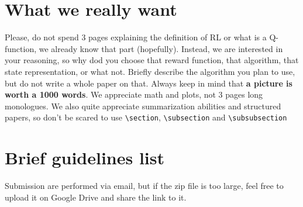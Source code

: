 \documentclass{article}
\begin{document}

\printAffiliationsAndNotice{\icmlEqualContribution} %

\begin{abstract}
This document provides a basic paper template and submission guidelines.
Abstracts should be a single paragraph, ideally between 4--6 sentences long, briefly describing the proposed solution.
\end{abstract}

\section{What we really want}
Please, do not spend 3 pages explaining the definition of RL or what is a Q-function, we already know that part (hopefully). Instead, we are interested in your reasoning, so why dod you choose that reward function, that algorithm, that state representation, or what not. Briefly describe the algorithm you plan to use, but do not write a whole paper on that. Always keep in mind that \textbf{a picture is worth a 1000 words}. We appreciate math and plots, not 3 pages long monologues. We also quite appreciate summarization abilities and structured papers, so don't be scared to use \texttt{\textbackslash section}, \texttt{\textbackslash subsection} and \texttt{\textbackslash subsubsection}

\section{Brief guidelines list}
\label{submission}

Submission are performed via email, but if the zip file is too large, feel free to upload it on Google Drive and share the link to it.
\end{document}
